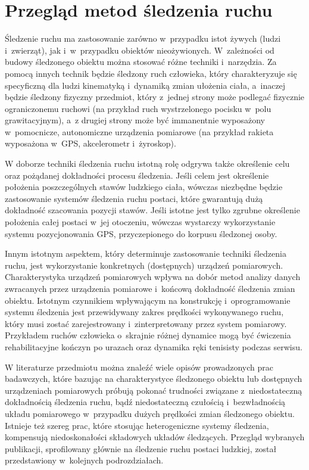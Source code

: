 \chapter{Przegląd metod śledzenia ruchu}\label{chap:literature}

Śledzenie ruchu ma zastosowanie zarówno w~przypadku istot żywych (ludzi i~zwierząt), jak i~w~przypadku obiektów nieożywionych. W~zależności od budowy śledzonego obiektu można stosować różne techniki i~narzędzia. Za pomocą innych technik będzie śledzony ruch człowieka, który charakteryzuje się specyficzną dla ludzi kinematyką i~dynamiką zmian ułożenia ciała, a~inaczej będzie śledzony fizyczny przedmiot, który z~jednej strony może podlegać fizycznie ograniczonemu ruchowi (na przykład ruch wystrzelonego pocisku w~polu grawitacyjnym), a~z drugiej strony może być immanentnie wyposażony w~pomocnicze, autonomiczne urządzenia pomiarowe (na przykład rakieta wyposażona w~GPS, akcelerometr i~żyroskop). 

W doborze techniki śledzenia ruchu istotną rolę odgrywa także określenie celu oraz pożądanej dokładności procesu śledzenia. Jeśli celem jest określenie położenia poszczególnych stawów ludzkiego ciała, wówczas niezbędne będzie zastosowanie systemów śledzenia ruchu postaci, które gwarantują dużą dokładność szacowania pozycji stawów. Jeśli istotne jest tylko zgrubne określenie położenia całej postaci w~jej otoczeniu, wówczas wystarczy wykorzystanie systemu pozycjonowania GPS, przyczepionego do korpusu śledzonej osoby.

Innym istotnym aspektem, który determinuje zastosowanie techniki śledzenia ruchu, jest wykorzystanie konkretnych (dostępnych) urządzeń pomiarowych. Charakterystyka urządzeń pomiarowych wpływa na dobór metod analizy danych zwracanych przez urządzenia pomiarowe i~końcową dokładność śledzenia zmian obiektu. Istotnym czynnikiem wpływającym na konstrukcję i~oprogramowanie systemu śledzenia jest przewidywany zakres prędkości wykonywanego ruchu, który musi zostać zarejestrowany i~zinterpretowany przez system pomiarowy. Przykładem ruchów człowieka o~skrajnie różnej dynamice  mogą być ćwiczenia rehabilitacyjne kończyn po urazach oraz dynamika ręki tenisisty podczas serwisu.  

W literaturze przedmiotu można znaleźć wiele opisów prowadzonych prac badawczych, które bazując na charakterystyce śledzonego obiektu lub dostępnych urządzeniach pomiarowych próbują pokonać trudności związane z~niedostateczną dokładnością śledzenia ruchu, bądź niedostateczną czułością i~bezwładnością układu pomiarowego w~przypadku dużych prędkości zmian śledzonego obiektu. Istnieje też szereg prac, które stosując heterogeniczne systemy śledzenia, kompensują niedoskonałości składowych układów śledzących. 
Przegląd wybranych publikacji, sprofilowany głównie na śledzenie ruchu postaci ludzkiej, został przedstawiony w~kolejnych podrozdziałach.

